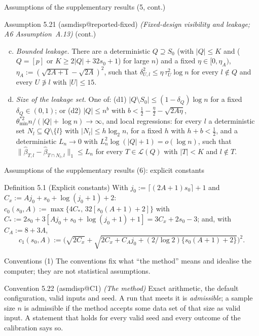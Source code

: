 \documentclass[aspectratio=169]{beamer}
\makeatletter
\newcommand{\asmdisp}[1]{\csname asmdisp@#1\endcsname}
\newcommand{\set}[1]{[#1]}
\newcommand{\abs}[1]{\lvert #1\rvert}
\newcommand{\norm}[1]{\lVert #1\rVert}
\newcommand{\Sz}{S_0}
\newcommand{\sz}{s_0}
\newcommand{\Lat}{\mathcal L}
\makeatother
\begin{document}
\begin{frame}{Assumptions of the supplementary results (5, cont.)}
\small
\begin{block}{Assumption 5.21 (\asmdisp{reported-fixed}) \textit{(Fixed-design visibility and leakage; A6 Assumption~A.13)} (cont.)}
\begin{enumerate}[(a)]\setcounter{enumi}{2}
  \item \emph{Bounded leakage.} There are a deterministic $Q\supseteq\Sz$ (with $\abs{Q}\le K$ and
    ($Q=\set{p}$ or $K\ge2\abs{Q}+32\sz+1$) for large $n$) and a fixed $\eta\in[0,\eta_A)$,
    $\eta_A:=(\sqrt{2A+1}-\sqrt{2A})^2$, such that $\delta^2_{U,l}\le\eta\,\tau^2_U\log n$ for every $l\notin Q$ and every
    $U\not\ni l$ with $\abs{U}\le15$.
  \item \emph{Size of the leakage set.} One of: (d1) $\abs{Q\setminus\Sz}\le(1-\delta_Q)\log n$ for a
    fixed $\delta_Q\in(0,1)$; or (d2) $\abs{Q}\le n^b$ with $b<\tfrac12-\tfrac\eta2-\sqrt{2A\eta}$,
    $\theta^{*2}_{\min}n/(\abs{Q}+\log n)\to\infty$, and local regressions: for every $l$ a deterministic set
    $N_l\subseteq Q\setminus\{l\}$ with $\abs{N_l}\le h\log_2n$, for a fixed $h$ with $h+b<\tfrac12$, and a deterministic
    $L_n\to0$ with $L_n^2\log(\abs{Q}+1)=o(\log n)$, such that $\norm{\hat\beta_{T,l}-\hat\beta_{T\cap N_l,l}}_1\le L_n$
    for every $T\in\Lat(Q)$ with $\abs{T}<K$ and $l\notin T$.
\end{enumerate}
\end{block}
\end{frame}

\begin{frame}{Assumptions of the supplementary results (6): explicit constants}
\small
\begin{block}{Definition 5.1 (Explicit constants)}
With $j_0:=\lceil(2A+1)\sz\rceil+1$ and $C_x:=Aj_0+\sz+\log(j_0+1)+2$:
$c_0(\sz,A):=\max\{4C_*,\,32[\sz(A+1)+2]\}$ with $C_*:=2\sz+3[Aj_0+\sz+\log(j_0+1)+1]=3C_x+2\sz-3$; and, with
$C_A:=8+3A$,
\[
  c_1(\sz,A):=\Big(\sqrt{2C_x}+\sqrt{2C_x+C_Aj_0+(2/\log2)\{\sz(A+1)+2\}}\Big)^2 .
\]
\end{block}
\end{frame}

\begin{frame}{Conventions (1)}
\small
\noindent The conventions fix what ``the method'' means and idealise the computer; they are not statistical assumptions.

\begin{block}{Convention 5.22 (\asmdisp{C1}) \textit{(The method)}}
Exact arithmetic, the default configuration, valid inputs and seed. A run that meets it is \emph{admissible}; a sample
size $n$ is admissible if the method accepts some data set of that size as valid input. A statement that holds for every
valid seed and every outcome of the calibration says so.
\end{block}
\end{frame}
\end{document}
